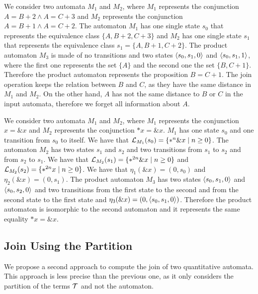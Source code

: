 
\begin{example}
    We consider two automata $M_1$ and $M_2$, where $M_1$ represents the conjunction $A = B + 2 \land A = C + 3$ and $M_2$ represents the conjunction $A = B + 1 \land A = C + 2$.
    The automaton $M_1$ has one single state $s_0$ that represents the equivalence class $\{A, B+2, C+3\}$
    and $M_2$ has one single state $s_1$ that represents the equivalence class $s_1 = \{A, B+1, C+2\}$.
    The product automaton $M_3$ is made of no transitions and two states $\langle s_0, s_1, 0\rangle$ and $\langle s_0, s_1, 1\rangle$, where the first one represents the set $\{A\}$ and the second one the set $\{B, C+1\}$.
    Therefore the product automaton represents the proposition $B = C + 1$.
    The join operation keeps the relation between $B$ and $C$, as they have the same distance in $M_1$ and $M_2$.
    On the other hand, $A$ has not the same distance to $B$ or $C$ in the input automata, therefore we forget all information about $A$.
\end{example}

\begin{example}\label{example:join-subset}
    We consider two automata $M_1$ and $M_2$, where $M_1$ represents the conjunction $x = \&x$ and $M_2$ represents the conjunction $*x = \&x$.
    $M_1$ has one state $s_0$ and one transition from $s_0$ to itself. We have that $\mathcal{L}_{M_1}(s_0) =\{*^n\&x\mid n \geq 0\}$.
    The automaton $M_2$ has two states $s_1$ and $s_2$ and two transitions from $s_1$ to $s_2$ and from $s_2$ to $s_1$. We have that $\mathcal{L}_{M_2}(s_1) = \{*^{2n}\&x\mid n \geq 0\}$ and $\mathcal{L}_{M_2}(s_2) = \{*^{2n}x\mid n \geq 0\}$.
    We have that $\eta_1(\&x) = (0, s_0)$ and $\eta_2 (\&x) = (0, s_1)$.
    The product automaton $M_3$ has two states $\langle s_0, s_1, 0\rangle$ and $\langle s_0, s_2, 0\rangle$ and two transitions from the first state to the second and from the second state to the first state and $\eta_3(\&x) = (0, \langle s_0, s_1, 0\rangle)$.
    Therefore the product automaton is isomorphic to the second automaton and it represents the same equality $*x = \&x$.
\end{example}

\subsection{Join Using the Partition}

We propose a second approach to compute the join of two quantitative automata.
This approach is less precise than the previous one, as it only considers the partition of the terms $\mathcal{T}$ and not the automaton.


